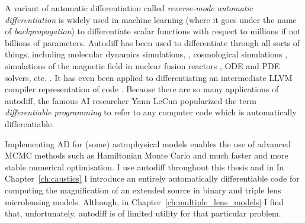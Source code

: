 \documentclass[12pt,dvipsnames]{report}
\begin{document}
A variant of automatic differentiation called \emph{reverse-mode automatic differentiation}
is widely used in machine learning (where it goes under the name of 
\emph{backpropagation}) to differentiate scalar functions with respect to 
millions if not billions of parameters. 
Autodiff has been used to differentiate through all sorts of things, including 
molecular dynamics simulations, \citep{arXiv:1912.04232}, cosmological simulations 
\citep{2016MNRAS.463.2273F}, simulations of the magnetic field in nuclear fusion 
reactors \citep{arXiv:2009.00196}, ODE and PDE solvers, etc. . It has even been 
applied to differentiating an intermediate LLVM compiler representation of code 
\citep{arXiv:2010.01709}.
Because there are so many applications of autodiff,
the famous AI researcher Yann LeCun popularized the term 
\emph{differentiable programming} to refer to any computer code which is 
automatically differentiable.

Implementing AD for (some) astrophysical models enables the use of advanced MCMC methods such as 
Hamiltonian Monte Carlo and much faster and more stable numerical optimisation.
I use autodiff throughout this thesis and in 
In Chapter~\ref{ch:caustics} I introduce an entirely automatically differentiable code for 
computing the magnification of an extended source in binary and triple lens microlensing
models. Although, in Chapter~\ref{ch:multiple_lens_models} I find that, unfortunately, 
autodiff is of limited utility for that particular problem.
\end{document}
